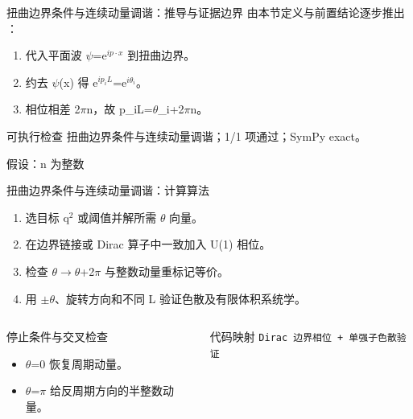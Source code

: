 \begin{frame}[t]{扭曲边界条件与连续动量调谐：推导与证据边界}
\footnotesize
{}\quad 由本节定义与前置结论逐步推出 ：
\begin{enumerate}
\item 代入平面波 \ensuremath{\psi}=e\ensuremath{^{ip\cdot x}} 到扭曲边界。
\item 约去 \ensuremath{\psi}(x) 得 e\ensuremath{^{ip_iL}}=e\ensuremath{^{i\theta_i}}。
\item 相位相差 2\ensuremath{\pi}n，故 p\_iL=\ensuremath{\theta}\_i+2\ensuremath{\pi}n。
\end{enumerate}\begin{block}{可执行检查}
\quad 扭曲边界条件与连续动量调谐；1/1 项通过；SymPy exact。
\par\scriptsize 假设：n 为整数
\end{block}
\end{frame}

\begin{frame}[t]{扭曲边界条件与连续动量调谐：计算算法}
\footnotesize
{}\begin{enumerate}
\item 选目标 q\ensuremath{^{2}} 或阈值并解所需 \ensuremath{\theta} 向量。
\item 在边界链接或 Dirac 算子中一致加入 U(1) 相位。
\item 检查 \ensuremath{\theta}\ensuremath{\rightarrow}\ensuremath{\theta}+2\ensuremath{\pi} 与整数动量重标记等价。
\item 用 \ensuremath{\pm}\ensuremath{\theta}、旋转方向和不同 L 验证色散及有限体积系统学。
\end{enumerate}\begin{columns}[T,onlytextwidth]
\begin{block}{停止条件与交叉检查}\scriptsize\begin{itemize}
\item[\CheckMark] \ensuremath{\theta}=0 恢复周期动量。
\item[\CheckMark] \ensuremath{\theta}=\ensuremath{\pi} 给反周期方向的半整数动量。
\end{itemize}\end{block}
\begin{block}{代码映射}
\scriptsize \texttt{Dirac 边界相位 + 单强子色散验证}
\end{block}\end{columns}\end{frame}

